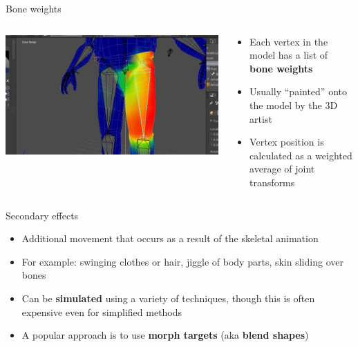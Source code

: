 \begin{frame}{Bone weights}
	\begin{columns}
		\begin{column}{0.4\textwidth}
			\includegraphics[width=\textwidth]{bone_weights}
		\end{column}
		\begin{column}{0.58\textwidth}
			\begin{itemize}
				\pause\item Each vertex in the model has a list of \textbf{bone weights}
				\pause\item Usually ``painted'' onto the model by the 3D artist
				\pause\item Vertex position is calculated as a weighted average of joint transforms
			\end{itemize}
		\end{column}
	\end{columns}
\end{frame}

\begin{frame}{Secondary effects}
	\begin{itemize}
		\pause\item Additional movement that occurs as a result of the skeletal animation
		\pause\item For example: swinging clothes or hair, jiggle of body parts, skin sliding over bones
		\pause\item Can be \textbf{simulated} using a variety of techniques, though this is often expensive even for simplified methods
		\pause\item A popular approach is to use \textbf{morph targets} (aka \textbf{blend shapes})
	\end{itemize}
\end{frame}

